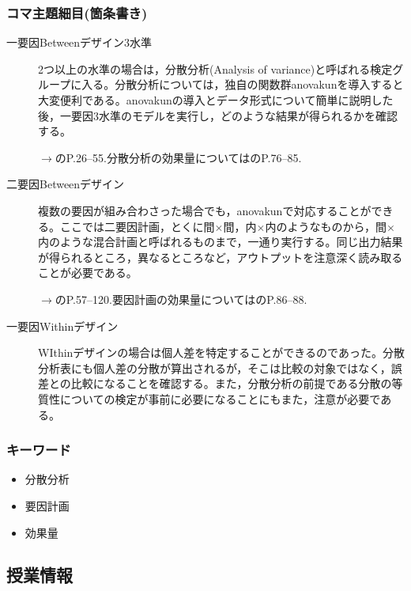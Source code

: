 \subsubsection{コマ主題細目(箇条書き)}
\begin{description}

	\item[一要因Betweenデザイン3水準]2つ以上の水準の場合は，分散分析(Analysis of variance)と呼ばれる検定グループに入る。分散分析については，独自の関数群anovakunを導入すると大変便利である。anovakunの導入とデータ形式について簡単に説明した後，一要因3水準のモデルを実行し，どのような結果が得られるかを確認する。

	      \begin{flushright}
		      $\to$\citet{Hashimoto201607}のP.26--55.分散分析の効果量については\citet{Matia201201}のP.76--85.
	      \end{flushright}

	\item[二要因Betweenデザイン]複数の要因が組み合わさった場合でも，anovakunで対応することができる。ここでは二要因計画，とくに間$\times$間，内$\times$内のようなものから，間$\times$内のような混合計画と呼ばれるものまで，一通り実行する。同じ出力結果が得られるところ，異なるところなど，アウトプットを注意深く読み取ることが必要である。

	      \begin{flushright}
		      $\to$\citet{Hashimoto201607}のP.57--120.要因計画の効果量については\citet{Matia201201}のP.86--88.
	      \end{flushright}

	\item[一要因Withinデザイン]WIthinデザインの場合は個人差を特定することができるのであった。分散分析表にも個人差の分散が算出されるが，そこは比較の対象ではなく，誤差との比較になることを確認する。また，分散分析の前提である分散の等質性についての検定が事前に必要になることにもまた，注意が必要である。

\end{description}
\subsubsection{キーワード}
\begin{itemize}
	\item 分散分析
	\item 要因計画
	\item 効果量
\end{itemize}
\subsection{授業情報}
